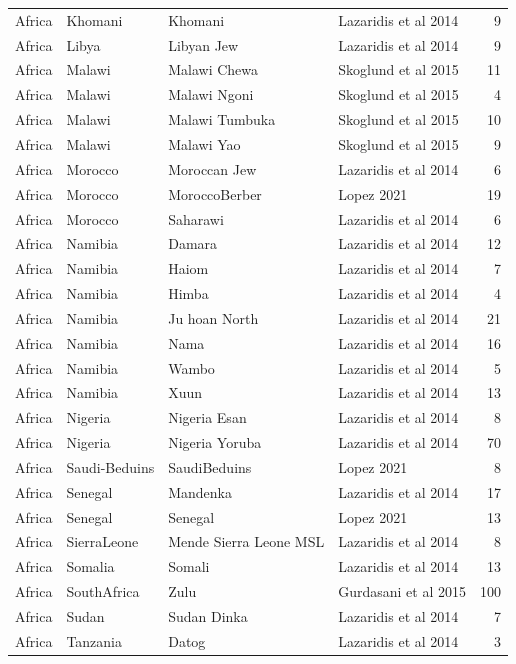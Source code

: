 \begin{longtable}[t]{lll>{\raggedright\arraybackslash}p{9em}r}
Africa & Khomani & Khomani & Lazaridis et al 2014 & 9\\
\addlinespace
Africa & Libya & Libyan Jew & Lazaridis et al 2014 & 9\\
Africa & Malawi & Malawi Chewa & Skoglund et al 2015 & 11\\
Africa & Malawi & Malawi Ngoni & Skoglund et al 2015 & 4\\
Africa & Malawi & Malawi Tumbuka & Skoglund et al 2015 & 10\\
Africa & Malawi & Malawi Yao & Skoglund et al 2015 & 9\\
\addlinespace
Africa & Morocco & Moroccan Jew & Lazaridis et al 2014 & 6\\
Africa & Morocco & MoroccoBerber & Lopez 2021 & 19\\
Africa & Morocco & Saharawi & Lazaridis et al 2014 & 6\\
Africa & Namibia & Damara & Lazaridis et al 2014 & 12\\
Africa & Namibia & Haiom & Lazaridis et al 2014 & 7\\
\addlinespace
Africa & Namibia & Himba & Lazaridis et al 2014 & 4\\
Africa & Namibia & Ju hoan North & Lazaridis et al 2014 & 21\\
Africa & Namibia & Nama & Lazaridis et al 2014 & 16\\
Africa & Namibia & Wambo & Lazaridis et al 2014 & 5\\
Africa & Namibia & Xuun & Lazaridis et al 2014 & 13\\
\addlinespace
Africa & Nigeria & Nigeria Esan & Lazaridis et al 2014 & 8\\
Africa & Nigeria & Nigeria Yoruba & Lazaridis et al 2014 & 70\\
Africa & Saudi-Beduins & SaudiBeduins & Lopez 2021 & 8\\
Africa & Senegal & Mandenka & Lazaridis et al 2014 & 17\\
Africa & Senegal & Senegal & Lopez 2021 & 13\\
\addlinespace
Africa & SierraLeone & Mende Sierra Leone MSL & Lazaridis et al 2014 & 8\\
Africa & Somalia & Somali & Lazaridis et al 2014 & 13\\
Africa & SouthAfrica & Zulu & Gurdasani et al 2015 & 100\\
Africa & Sudan & Sudan Dinka & Lazaridis et al 2014 & 7\\
Africa & Tanzania & Datog & Lazaridis et al 2014 & 3\\

\end{longtable}
